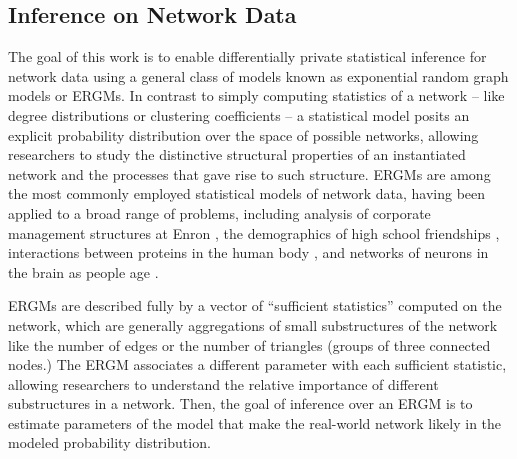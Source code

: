 \subsection{Inference on Network Data}

The goal of this work is to enable differentially private statistical inference for network data using a general class of models known as exponential random graph models or ERGMs. In contrast to simply computing statistics of a network -- like degree distributions or clustering coefficients -- a statistical model posits an explicit probability distribution over the space of possible networks, allowing researchers to study the distinctive structural properties of an instantiated network and the processes that gave rise to such structure. ERGMs are among the most commonly employed statistical models of network data, having been applied to a broad range of problems, including analysis of corporate management structures at Enron \cite{UHH13}, the demographics of high school friendships \cite{GKM09}, interactions between proteins in the human body \cite{EBB10}, and networks of neurons in the brain as people age  \cite{Sin+16}.

ERGMs are described fully by a vector of ``sufficient statistics'' computed on the network, which are generally aggregations of small substructures of the network like the number of edges or the number of triangles (groups of three connected nodes.) The ERGM associates a different parameter with each sufficient statistic, allowing researchers to understand the relative importance of different substructures in a network. Then, the goal of inference over an ERGM is to estimate parameters of the model that make the real-world network likely in the modeled probability distribution. 


